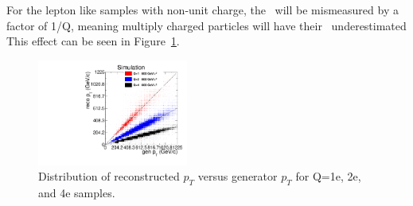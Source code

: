 For the lepton like samples with non-unit charge, the \pt\ will be mismeasured by a factor of 1/Q, meaning multiply charged particles will have their \pt\ underestimated
This effect can be seen in Figure~\ref{fig:RecoGenPt}.

\begin{figure}
 \begin{center}
  \includegraphics[width=0.44\textwidth]{figures/tkonly/SIM_Validation_Pt.pdf}
 \end{center}
 \caption{Distribution of reconstructed $p_T$ versus generator $p_T$ for Q=1e, 2e, and 4e samples.
    \label{fig:RecoGenPt}}
\end{figure}